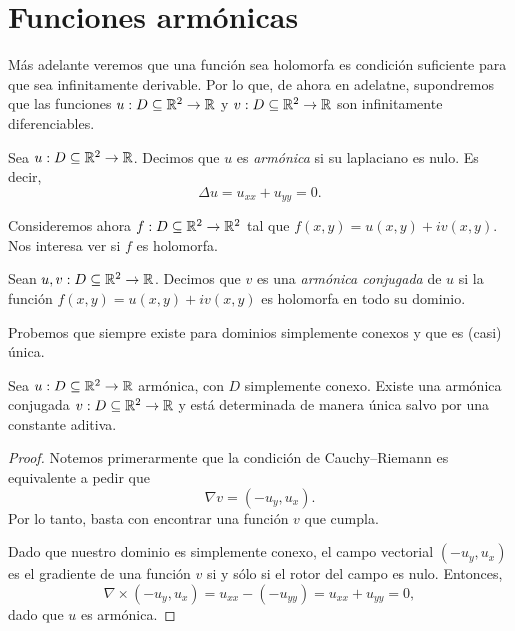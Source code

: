 \section{Funciones armónicas}

Más adelante veremos que una función sea holomorfa es condición suficiente para que sea infinitamente derivable. Por lo que, de ahora en adelatne, supondremos que las funciones $u: D \subseteq \mathbb{R}^2 \to \mathbb{R}$ y $v: D \subseteq \mathbb{R}^2 \to \mathbb{R}$ son infinitamente diferenciables.

\begin{definition}
    Sea $u: D \subseteq \mathbb{R}^2 \to \mathbb{R}$. Decimos que $u$ es \emph{armónica} si su laplaciano es nulo. Es decir,
    \begin{equation*}
        \Delta u = u_{xx} + u_{yy} = 0.
    \end{equation*}
\end{definition}

Consideremos ahora $f: D \subseteq \mathbb{R}^2 \to \mathbb{R}^2$ tal que $f(x, y) = u(x, y)+ i v(x, y)$. Nos interesa ver si $f$ es holomorfa.

\begin{definition}
    Sean $u, v: D \subseteq \mathbb{R}^2 \to \mathbb{R}$. Decimos que $v$ es una \emph{armónica conjugada} de $u$ si la función $f(x, y) = u(x, y) + i v(x, y)$ es holomorfa en todo su dominio.
\end{definition}

Probemos que siempre existe para dominios simplemente conexos y que es (casi) única.

\begin{proposition}
    Sea $u: D \subseteq \mathbb{R}^2 \to \mathbb{R}$ armónica, con $D$ simplemente conexo. Existe una armónica conjugada $v: D \subseteq \mathbb{R}^2 \to \mathbb{R}$ y está determinada de manera única salvo por una constante aditiva.
\end{proposition}

\begin{proof}
    Notemos primerarmente que la condición de Cauchy--Riemann es equivalente a pedir que 
    \begin{equation*}
        \nabla v = (-u_y, u_x).
    \end{equation*}
    Por lo tanto, basta con encontrar una función $v$ que cumpla. 

    Dado que nuestro dominio es simplemente conexo, el campo vectorial $(-u_y, u_x)$ es el gradiente de una función $v$ si y sólo si el rotor del campo es nulo. Entonces,
    \begin{equation*}
        \nabla \times (-u_y, u_x) = u_{xx} - (-u_{yy}) = u_{xx} + u_{yy} = 0,
    \end{equation*}
    dado que $u$ es armónica.
\end{proof}

